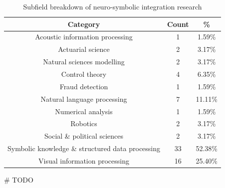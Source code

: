 \begin{table}[!htbp]
\centering
\begin{tabular}{ |c|c|c| }
 \hline
 \textbf{Category} & \textbf{Count} & \textbf{\%} \\
 \hline
 Acoustic information processing & 1 & 1.59\% \\
 \hline
 Actuarial science & 2 & 3.17\% \\
 \hline
 Natural sciences modelling & 2 & 3.17\% \\
 \hline
 Control theory & 4 & 6.35\% \\
 \hline
 Fraud detection & 1 & 1.59\% \\
 \hline
 Natural language processing & 7 & 11.11\% \\
 \hline
 Numerical analysis & 1 & 1.59\% \\
 \hline
 Robotics & 2 & 3.17\% \\
 \hline
 Social \& political sciences & 2 & 3.17\% \\
 \hline
 Symbolic knowledge \& structured data processing & 33 & 52.38\%  \\
 \hline
 Visual information processing & 16 & 25.40\%  \\
 \hline
\end{tabular}
\caption{Subfield breakdown of neuro-symbolic integration research}
\label{subject_breakdown}
\end{table}

\# TODO
